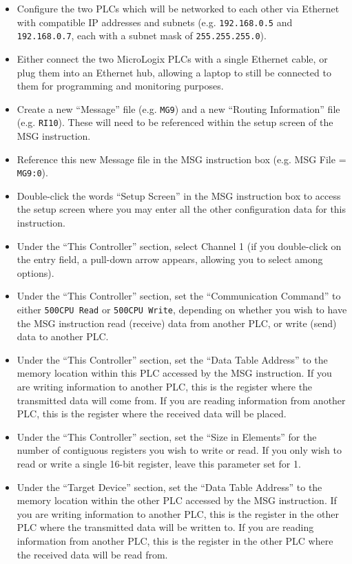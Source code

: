 \begin{itemize}
\item{} Configure the two PLCs which will be networked to each other via Ethernet with compatible IP addresses and subnets (e.g. {\tt 192.168.0.5} and {\tt 192.168.0.7}, each with a subnet mask of {\tt 255.255.255.0}).
\vskip 5pt
\item{} Either connect the two MicroLogix PLCs with a single Ethernet cable, or plug them into an Ethernet hub, allowing a laptop to still be connected to them for programming and monitoring purposes.
\vskip 5pt
\item{} Create a new ``Message'' file (e.g. {\tt MG9}) and a new ``Routing Information'' file (e.g. {\tt RI10}).  These will need to be referenced within the setup screen of the MSG instruction.
\vskip 5pt
\item{} Reference this new Message file in the MSG instruction box (e.g. MSG File = {\tt MG9:0}).
\vskip 5pt
\item{} Double-click the words ``Setup Screen'' in the MSG instruction box to access the setup screen where you may enter all the other configuration data for this instruction.
\vskip 5pt
\item{} Under the ``This Controller'' section, select Channel 1 (if you double-click on the entry field, a pull-down arrow appears, allowing you to select among options).
\vskip 5pt
\item{} Under the ``This Controller'' section, set the ``Communication Command'' to either {\tt 500CPU Read} or {\tt 500CPU Write}, depending on whether you wish to have the MSG instruction read (receive) data from another PLC, or write (send) data to another PLC.
\vskip 5pt
\item{} Under the ``This Controller'' section, set the ``Data Table Address'' to the memory location within this PLC accessed by the MSG instruction.  If you are writing information to another PLC, this is the register where the transmitted data will come from.  If you are reading information from another PLC, this is the register where the received data will be placed.
\vskip 5pt
\item{} Under the ``This Controller'' section, set the ``Size in Elements'' for the number of contiguous registers you wish to write or read.  If you only wish to read or write a single 16-bit register, leave this parameter set for 1.
\vskip 5pt
\item{} Under the ``Target Device'' section, set the ``Data Table Address'' to the memory location within the other PLC accessed by the MSG instruction.  If you are writing information to another PLC, this is the register in the other PLC where the transmitted data will be written to.  If you are reading information from another PLC, this is the register in the other PLC where the received data will be read from.

\end{itemize}
